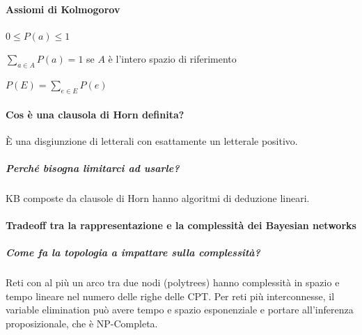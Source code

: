 \documentclass[10pt]{report}
\begin{document}
\paragraph{Assiomi di Kolmogorov}
\begin{list}{}{}
	\item $0\leq P(a) \leq 1$
	\item $\sum_{a\in A} P(a) = 1$ se $A$ è l'intero spazio di riferimento
	\item $P(E) = \sum_{e\in E} P(e)$
\end{list}
\paragraph{Cos è una clausola di Horn definita?} È una disgiunzione di letterali con esattamente un letterale positivo.
\subparagraph{Perché bisogna limitarci ad usarle?} KB composte da clausole di Horn hanno algoritmi di deduzione lineari.
\paragraph{Tradeoff tra la rappresentazione e la complessità dei Bayesian networks} 
\subparagraph{Come fa la topologia a impattare sulla complessità?} Reti con al più un arco tra due nodi (polytrees) hanno complessità in spazio e tempo lineare nel numero delle righe delle CPT. Per reti più interconnesse, il variable elimination può avere tempo e spazio esponenziale e portare all'inferenza proposizionale, che è NP-Completa.
\end{document}
